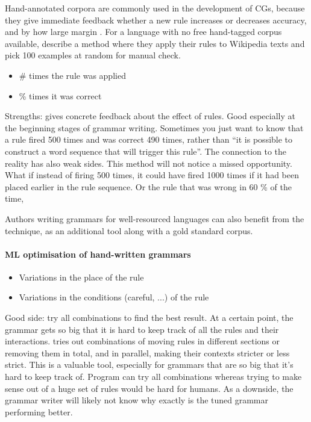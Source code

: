 Hand-annotated corpora are commonly used in the development of CGs, because they give immediate feedback whether a new rule increases or decreases accuracy, and by how large margin \cite{voutilainen2004}. For a language with no free hand-tagged corpus available, \cite{tyers_reynolds2015} describe a method where they apply their rules to Wikipedia texts and pick 100 examples at random for manual check.
\begin{itemize}
\item \# times the rule was applied
\item \% times it was correct
\end{itemize}
Strengths: gives concrete feedback about the effect of rules. 
Good especially at the beginning stages of grammar writing. 
Sometimes you just want to know that a rule fired 500 times and was correct 490 times, rather than ``it is possible to construct a word sequence that will trigger this rule''.
The connection to the reality has also weak sides. This method will not notice a missed opportunity. What if instead of firing 500 times, it could have fired 1000 times if it had been placed earlier in the rule sequence.
Or the rule that was wrong in 60 \% of the time,

Authors writing grammars for well-resourced languages can also benefit from the technique, as an additional tool along with a gold standard corpus. 


\paragraph{ML optimisation of hand-written grammars}
\begin{itemize}
\item Variations in the place of the rule
\item Variations in the conditions (careful, ...) of the rule
\end{itemize}
Good side: try all combinations to find the best result. 
At a certain point, the grammar gets so big that it is hard to keep track of all the rules and their interactions. \cite{bick2013tuning} tries out combinations of moving rules in different sections or removing them in total, and in parallel, making their contexts stricter or less strict. 
This is a valuable tool, especially for grammars that are so big that it's hard to keep track of. Program can try all combinations whereas trying to make sense out of a huge set of rules would be hard for humans.
As a downside, the grammar writer will likely not know why exactly is the tuned grammar performing better.


